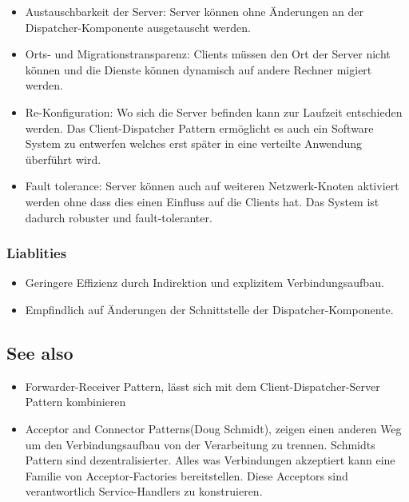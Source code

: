 \begin{itemize}
	\item Austauschbarkeit der Server: Server können ohne Änderungen an der Dispatcher-Komponente ausgetauscht werden.
	\item Orts- und Migrationstransparenz: Clients müssen den Ort der Server nicht können und die Dienste können dynamisch auf andere Rechner migiert werden.
	\item Re-Konfiguration: Wo sich die Server befinden kann zur Laufzeit entschieden werden. Das Client-Dispatcher Pattern ermöglicht es auch ein Software System zu entwerfen welches erst später in eine verteilte Anwendung überführt wird.
	\item Fault tolerance: Server können auch auf weiteren Netzwerk-Knoten aktiviert werden ohne dass dies einen Einfluss auf die Clients hat. Das System ist dadurch robuster und fault-toleranter.
\end{itemize}

\subsubsection*{Liablities}


\begin{itemize}
	\item Geringere Effizienz durch Indirektion und explizitem Verbindungsaufbau.
	\item Empfindlich auf Änderungen der Schnittstelle der Dispatcher-Komponente.
\end{itemize}

\subsection*{See also}


\begin{itemize}
	\item Forwarder-Receiver Pattern, lässt sich mit dem Client-Dispatcher-Server Pattern kombinieren
	\item Acceptor and Connector Patterns(Doug Schmidt), zeigen einen anderen Weg um den Verbindungsaufbau von der Verarbeitung zu trennen. Schmidts Pattern sind dezentralisierter. Alles was Verbindungen akzeptiert kann eine Familie von Acceptor-Factories bereitstellen. Diese Acceptors sind verantwortlich Service-Handlers zu konstruieren.
\end{itemize}
